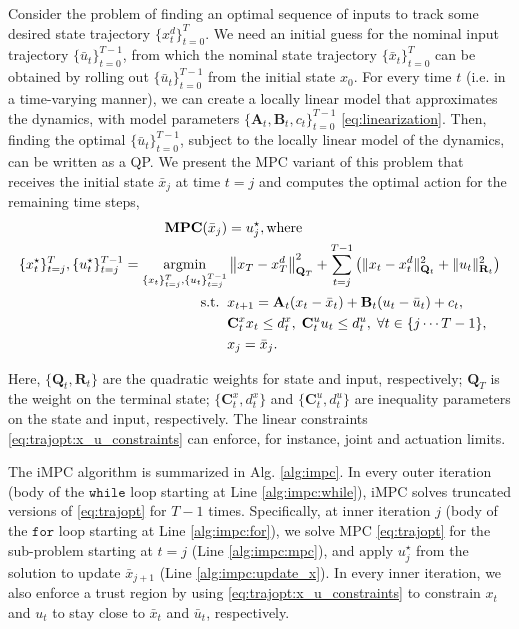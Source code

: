 Consider the problem of finding an optimal sequence of inputs to track some desired state trajectory $\{x^d_t\}_{t=0}^T$. We need an initial guess for the nominal input trajectory $\{\bar{u}_t\}^{T-1}_{t=0}$, from which the nominal state trajectory $\{\bar{x}_t\}^T_{t=0}$ can be obtained by rolling out $\{\bar{u}_t\}^{T-1}_{t=0}$ from the initial state $x_0$. For every time $t$ (i.e. in a time-varying manner), we can create a locally linear model that approximates the dynamics, with model parameters $\{\mathbf{A}_t,\mathbf{B}_t,c_t\}_{t=0}^{T-1}$ \eqref{eq:linearization}. Then, finding the optimal $\{\bar{u}_t\}^{T-1}_{t=0}$, subject to the locally linear model of the dynamics, can be written as a QP. We present the MPC variant of this problem that receives the initial state $\bar{x}_j$ at time $t=j$ and computes the optimal action for the remaining time steps,
\begin{subequations}
\label{eq:trajopt}
\begin{align}
\textbf{MPC}(\bar{x}_j) & = u^\star_j, \text{where}\\
\{x_t^\star\}_{t=j}^T, \{u_t^\star\}_{t=j}^{T-1}
=\underset{\{x_t\}_{t=j}^T, \{u_t\}_{t=j}^{T-1}}{\text{argmin}} & \left\lVert{x_T-x_T^d}\right\rVert_{\mathbf{Q}_T}^2 + \sum^{T-1}_{t=j} \left(\|x_t - x^d_t\|^2_{\mathbf{Q}_t} + \|u_t\|^2_{\mathbf{R}_t}\right)\\
\text{s.t.}\;\; & x_{t+1} = \mathbf{A}_t(x_t-\bar{x}_t) + \mathbf{B}_t(u_t - \bar{u}_t) + c_t,\\
& \mathbf{C}^x_t x_t\leq d^x_t,\; \mathbf{C}^u_t u_t \leq d^u_t, \; \forall t\in\{j \cdots T-1\},\\
& x_j = \bar{x}_j.
\label{eq:trajopt:x_u_constraints}
\end{align}
\end{subequations}

Here, $\{\mathbf{Q}_t,\mathbf{R}_t\}$ are the quadratic weights for state and input, respectively; $\mathbf{Q}_T$ is the weight on the terminal state; $\{\mathbf{C}^x_t,d^x_t\}$ and $\{\mathbf{C}^u_t,d^u_t\}$ are inequality parameters on the state and input, respectively. The linear constraints \eqref{eq:trajopt:x_u_constraints} can enforce, for instance, joint and actuation limits.

The iMPC algorithm is summarized in Alg. \ref{alg:impc}. 
In every outer iteration (body of the $\mathtt{while}$ loop starting at Line \ref{alg:impc:while}), iMPC solves truncated versions of \eqref{eq:trajopt} for $T - 1$ times. Specifically, at inner iteration $j$ (body of the $\mathtt{for}$ loop starting at Line \ref{alg:impc:for}), we solve MPC \eqref{eq:trajopt} for the sub-problem starting at $t=j$ (Line \ref{alg:impc:mpc}), and apply $u_j^\star$ from the solution to update $\bar{x}_{j+1}$ (Line \ref{alg:impc:update_x}). In every inner iteration, we also enforce a trust region by using \eqref{eq:trajopt:x_u_constraints} to constrain $x_t$ and $u_t$ to stay close to $\bar{x}_t$ and $\bar{u}_t$, respectively.

